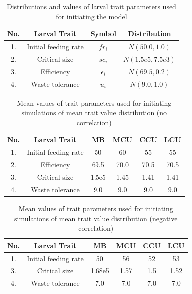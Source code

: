 \begin{table}[h]
  \centering
  \begin{tabular}{|c|c|c|c|}
    \hline
    \textbf{No.} & \textbf{Larval Trait} & \textbf{Symbol} & \textbf{Distribution} \\
    \hline
    1. & Initial feeding rate & $fr_{i}$ & $N(50.0,1.0)$ \\
    \hline
    2. & Critical size & $sc_{i}$ & $N(1.5e5,7.5e3)$ \\
    \hline
    3. & Efficiency & $\epsilon_{i}$ & $N(69.5,0.2)$ \\
    \hline
    4. & Waste tolerance & $u_{i}$ & $N(9.0,1.0)$ \\
    \hline
  \end{tabular}
  \caption{Distributions and values of larval trait parameters used for initiating the model}
  \label{tab:trait_value}
\end{table}

\begin{table}[p]
  \centering
  \begin{tabular}{|c|c|c|c|c|c|}
    \hline
    \textbf{No.} & \textbf{Larval Trait} & \textbf{MB} & \textbf{MCU} & \textbf{CCU} & \textbf{LCU}\\
    \hline
    1. & Initial feeding rate & 50 & 60 & 55 & 55 \\
    \hline
    2. & Efficiency & 69.5 & 70.0 & 70.5 & 70.5 \\
    \hline
    3. & Critical size & 1.5e5 & 1.45 & 1.41 & 1.41 \\
    \hline
    4. & Waste tolerance & 9.0 & 9.0 & 9.0 & 9.0 \\
    \hline
  \end{tabular}
  \caption{Mean values of trait parameters used for initiating simulations of mean trait value distribution (no correlation)}
  \label{tab:dist_param}
\end{table}

\begin{table}[p]
  \centering
  \begin{tabular}{|c|c|c|c|c|c|}
    \hline
    \textbf{No.} & \textbf{Larval Trait} & \textbf{MB} & \textbf{MCU} & \textbf{CCU} & \textbf{LCU}\\
    \hline
    1. & Initial feeding rate & 50 & 56 & 52 & 53 \\
    \hline
    3. & Critical size & 1.68e5 & 1.57 & 1.5 & 1.52 \\
    \hline
    4. & Waste tolerance & 7.0 & 7.0 & 7.0 & 7.0 \\
    \hline
  \end{tabular}
  \caption{Mean values of trait parameters used for initiating simulations of mean trait value distribution (negative correlation)}
  \label{tab:neg_dist_param}
\end{table}

